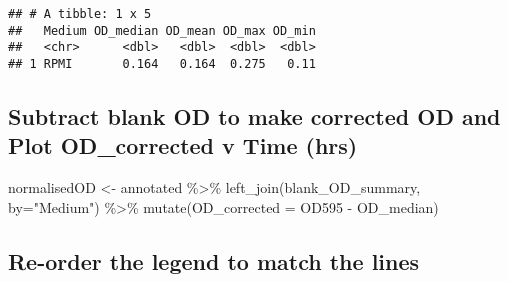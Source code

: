 \documentclass[
]{article}
\newenvironment{Shaded}{\begin{snugshade}}{\end{snugshade}}
\newcommand{\AttributeTok}[1]{\textcolor[rgb]{0.77,0.63,0.00}{#1}}
\newcommand{\FunctionTok}[1]{\textcolor[rgb]{0.00,0.00,0.00}{#1}}
\newcommand{\NormalTok}[1]{#1}
\newcommand{\OtherTok}[1]{\textcolor[rgb]{0.56,0.35,0.01}{#1}}
\newcommand{\SpecialCharTok}[1]{\textcolor[rgb]{0.00,0.00,0.00}{#1}}
\newcommand{\StringTok}[1]{\textcolor[rgb]{0.31,0.60,0.02}{#1}}
\begin{document}
\begin{verbatim}
## # A tibble: 1 x 5
##   Medium OD_median OD_mean OD_max OD_min
##   <chr>      <dbl>   <dbl>  <dbl>  <dbl>
## 1 RPMI       0.164   0.164  0.275   0.11
\end{verbatim}

\hypertarget{subtract-blank-od-to-make-corrected-od-and-plot-od_corrected-v-time-hrs}{%
\subsection{Subtract blank OD to make corrected OD and Plot
OD\_corrected v Time
(hrs)}\label{subtract-blank-od-to-make-corrected-od-and-plot-od_corrected-v-time-hrs}}

\begin{Shaded}
\begin{Highlighting}[]
\NormalTok{normalisedOD }\OtherTok{\textless{}{-}}\NormalTok{ annotated }\SpecialCharTok{\%\textgreater{}\%}
            \FunctionTok{left\_join}\NormalTok{(blank\_OD\_summary, }\AttributeTok{by=}\StringTok{"Medium"}\NormalTok{) }\SpecialCharTok{\%\textgreater{}\%}
            \FunctionTok{mutate}\NormalTok{(}\AttributeTok{OD\_corrected =}\NormalTok{ OD595 }\SpecialCharTok{{-}}\NormalTok{ OD\_median)}
\end{Highlighting}
\end{Shaded}

\hypertarget{re-order-the-legend-to-match-the-lines}{%
\subsection{Re-order the legend to match the
lines}\label{re-order-the-legend-to-match-the-lines}}

\begin{Shaded}
\end{Shaded}
\end{document}
